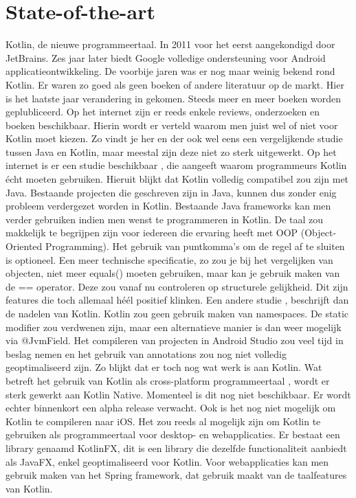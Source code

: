 \section{State-of-the-art}
\label{sec:state-of-the-art}
Kotlin, de nieuwe programmeertaal. In 2011 voor het eerst aangekondigd door JetBrains. Zes jaar later biedt Google volledige ondersteuning voor Android applicatieontwikkeling. De voorbije jaren was er nog maar weinig bekend rond Kotlin. Er waren zo goed als geen boeken of andere literatuur op de markt. Hier is het laatste jaar verandering in gekomen. Steeds meer en meer boeken worden geplubliceerd. 
\newline
\newline
Op het internet zijn er reeds enkele reviews, onderzoeken en boeken beschikbaar. Hierin wordt er verteld waarom men juist wel of niet voor Kotlin moet kiezen. Zo vindt je her en der ook wel eens een vergelijkende studie tussen Java en Kotlin, maar meestal zijn deze niet zo sterk uitgewerkt.
\newline
\newline
Op het internet is er een studie beschikbaar \autocite{Pros}, die aangeeft waarom programmeurs Kotlin écht moeten gebruiken. Hieruit blijkt dat Kotlin volledig compatibel zou zijn met Java. Bestaande projecten die geschreven zijn in Java, kunnen dus zonder enig probleem verdergezet worden in Kotlin. Bestaande Java frameworks kan men verder gebruiken indien men wenst te programmeren in Kotlin. De taal zou makkelijk te begrijpen zijn voor iedereen die ervaring heeft met OOP (Object-Oriented Programming). Het gebruik van puntkomma's om de regel af te sluiten is optioneel. Een meer technische specificatie, zo zou je bij het vergelijken van objecten, niet meer equals() moeten gebruiken, maar kan je gebruik maken van de == operator. Deze zou vanaf nu controleren op structurele gelijkheid. Dit zijn features die toch allemaal héél positief klinken.
\newline
\newline
Een andere studie \autocite{Cons}, beschrijft dan de nadelen van Kotlin. Kotlin zou geen gebruik maken van namespaces. De static modifier zou verdwenen zijn, maar een alternatieve manier is dan weer mogelijk via @JvmField. Het compileren van projecten in Android Studio zou veel tijd in beslag nemen en het gebruik van annotations zou nog niet volledig geoptimaliseerd zijn. Zo blijkt dat er toch nog wat werk is aan Kotlin.
\newline
\newline
Wat betreft het gebruik van Kotlin als cross-platform programmeertaal \autocite{dzone}, wordt er sterk gewerkt aan Kotlin Native. Momenteel is dit nog niet beschikbaar. Er wordt echter binnenkort een alpha release verwacht. Ook is het nog niet mogelijk om Kotlin te compileren naar iOS. Het zou reeds al mogelijk zijn om Kotlin te gebruiken als programmeertaal voor desktop- en webapplicaties. Er bestaat een library genaamd KotlinFX, dit is een library die dezelfde functionaliteit aanbiedt als JavaFX, enkel geoptimaliseerd voor Kotlin. Voor webapplicaties kan men gebruik maken van het Spring framework, dat gebruik maakt van de taalfeatures van Kotlin.
